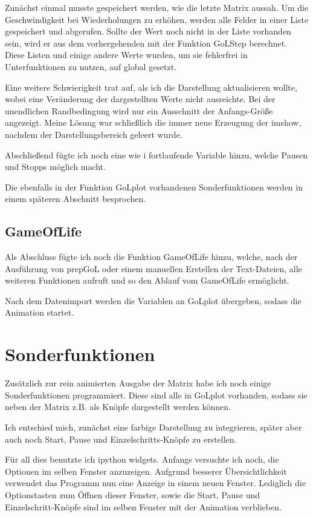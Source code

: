 \documentclass{scrartcl}
\begin{document}
Zunächst einmal musste gespeichert werden, wie die letzte  Matrix aussah. Um die Geschwindigkeit bei Wiederholungen zu erhöhen, werden alle Felder in einer Liste gespeichert und abgerufen. Sollte der Wert noch nicht in der Liste vorhanden sein, wird er aus dem vorhergehenden mit der Funktion GoLStep berechnet. Diese Listen und einige andere Werte wurden, um sie fehlerfrei in Unterfunktionen zu nutzen, auf global gesetzt.

Eine weitere Schwierigkeit trat auf, als ich die Darstellung aktualisieren wollte, wobei eine Veränderung der dargestellten Werte nicht ausreichte. Bei der unendlichen Randbedingung wird nur ein Ausschnitt der Anfangs-Größe angezeigt. Meine Lösung war schließlich die immer neue Erzeugung der imshow, nachdem der Darstellungsbereich geleert wurde.

Abschließend fügte ich noch eine wie i fortlaufende Variable hinzu, welche Pausen und Stopps möglich macht.

Die ebenfalls in der Funktion GoLplot vorhandenen Sonderfunktionen werden in einem späteren Abschnitt besprochen.

\subsection{GameOfLife}
Als Abschluss fügte ich noch die Funktion GameOfLife hinzu, welche, nach der Ausführung von prepGoL oder einem manuellen Erstellen der Text-Dateien, alle weiteren Funktionen aufruft und so den Ablauf vom GameOfLife ermöglicht.

Nach dem Datenimport werden die Variablen an GoLplot übergeben, sodass die Animation startet.

\section{Sonderfunktionen}
Zusätzlich zur rein animierten Ausgabe der Matrix habe ich noch einige Sonderfunktionen programmiert. Diese sind alle in GoLplot vorhanden, sodass sie neben der Matrix z.B. als Knöpfe dargestellt werden können.

Ich entschied mich, zunächst eine farbige Darstellung zu integrieren, später aber auch noch Start, Pause und Einzelschritts-Knöpfe zu erstellen. %

Für all dies benutzte ich ipython widgets.
Anfangs versuchte ich noch, die Optionen im selben Fenster anzuzeigen. Aufgrund besserer Übersichtlichkeit verwendet das Programm nun eine Anzeige in einem neuen Fenster. Lediglich die Optionstasten zum Öffnen dieser Fenster, sowie die Start, Pause und Einzelschritt-Knöpfe sind im selben Fenster mit der Animation verblieben.
\end{document}

